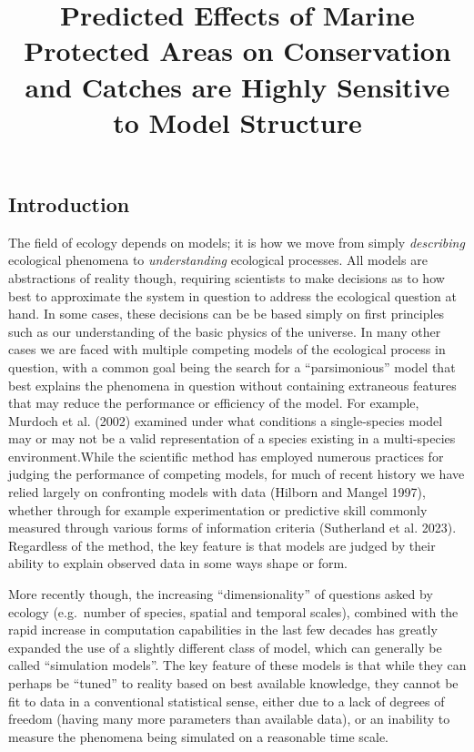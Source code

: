 \documentclass[
  default,
  lineno,
  referee]{sn-jnl}
\title[Predicted Effects of Marine Protected Areas on Conservation and
Catches are Highly Sensitive to Model Structure]{Predicted Effects of
Marine Protected Areas on Conservation and Catches are Highly Sensitive
to Model Structure}
\author*[1]{\fnm{Daniel} \sur{Ovando}}\equalcont{These authors contributed equally to this work.}
\affil[1]{\orgdiv{Ecosystem \& Bycatch Group}, \orgname{Inter-American
Tropical Tuna Commission}, \orgaddress{\street{8901 La Jolla Shores
Drive}, \city{La Jolla}, \postcode{92037}}}
\renewcommand*\contentsname{Table of contents}
\newcommand\contentsname{Table of contents}
\begin{document}
\maketitle

\renewcommand*\contentsname{Table of contents}
{
\hypersetup{linkcolor=}
\setcounter{tocdepth}{3}
\tableofcontents
}
\subsection{Introduction}\label{introduction}

The field of ecology depends on models; it is how we move from simply
\emph{describing} ecological phenomena to \emph{understanding}
ecological processes. All models are abstractions of reality though,
requiring scientists to make decisions as to how best to approximate the
system in question to address the ecological question at hand. In some
cases, these decisions can be be based simply on first principles such
as our understanding of the basic physics of the universe. In many other
cases we are faced with multiple competing models of the ecological
process in question, with a common goal being the search for a
``parsimonious'' model that best explains the phenomena in question
without containing extraneous features that may reduce the performance
or efficiency of the model. For example, Murdoch et al. (2002) examined
under what conditions a single-species model may or may not be a valid
representation of a species existing in a multi-species
environment.While the scientific method has employed numerous practices
for judging the performance of competing models, for much of recent
history we have relied largely on confronting models with data (Hilborn
and Mangel 1997), whether through for example experimentation or
predictive skill commonly measured through various forms of information
criteria (Sutherland et al. 2023). Regardless of the method, the key
feature is that models are judged by their ability to explain observed
data in some ways shape or form.

More recently though, the increasing ``dimensionality'' of questions
asked by ecology (e.g.~number of species, spatial and temporal scales),
combined with the rapid increase in computation capabilities in the last
few decades has greatly expanded the use of a slightly different class
of model, which can generally be called ``simulation models''. The key
feature of these models is that while they can perhaps be ``tuned'' to
reality based on best available knowledge, they cannot be fit to data in
a conventional statistical sense, either due to a lack of degrees of
freedom (having many more parameters than available data), or an
inability to measure the phenomena being simulated on a reasonable time
scale.
\end{document}
